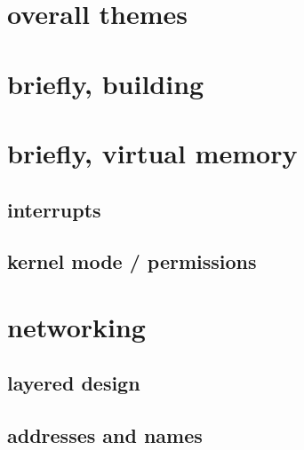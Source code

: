 \section{overall themes}


\section{briefly, building}



\section{briefly, virtual memory}






\subsection{interrupts}








\subsection{kernel mode / permissions}




\section{networking}


\subsection{layered design}



\subsection{addresses and names}

